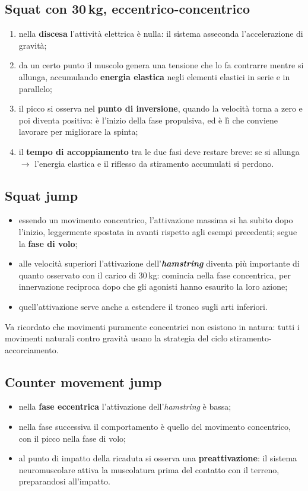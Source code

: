 \subsection{Squat con 30\,kg, eccentrico-concentrico}
\begin{enumerate}
  \item nella \textbf{discesa} l'attività elettrica è nulla: il sistema asseconda l'accelerazione di
    gravità;
  \item da un certo punto il muscolo genera una tensione che lo fa contrarre mentre si allunga,
    accumulando \textbf{energia elastica} negli elementi elastici in serie e in parallelo;
  \item il picco si osserva nel \textbf{punto di inversione}, quando la velocità torna a zero e poi
    diventa positiva: è l'inizio della fase propulsiva, ed è lì che conviene lavorare per migliorare
    la spinta;
  \item il \textbf{tempo di accoppiamento} tra le due fasi deve restare breve: se si allunga
    $\rightarrow$ l'energia elastica e il riflesso da stiramento accumulati si perdono.
\end{enumerate}

\subsection{Squat jump}
\begin{itemize}
  \item essendo un movimento concentrico, l'attivazione massima si ha subito dopo l'inizio,
    leggermente spostata in avanti rispetto agli esempi precedenti; segue la \textbf{fase di volo};
  \item alle velocità superiori l'attivazione dell'\textbf{\textit{hamstring}} diventa più
    importante di quanto osservato con il carico di 30\,kg: comincia nella fase concentrica, per
    innervazione reciproca dopo che gli agonisti hanno esaurito la loro azione;
  \item quell'attivazione serve anche a estendere il tronco sugli arti inferiori.
\end{itemize}
Va ricordato che movimenti puramente concentrici non esistono in natura: tutti i movimenti naturali
contro gravità usano la strategia del ciclo stiramento-accorciamento.

\subsection{Counter movement jump}
\begin{itemize}
  \item nella \textbf{fase eccentrica} l'attivazione dell'\textit{hamstring} è bassa;
  \item nella fase successiva il comportamento è quello del movimento concentrico, con il picco
    nella fase di volo;
  \item al punto di impatto della ricaduta si osserva una \textbf{preattivazione}: il sistema
    neuromuscolare attiva la muscolatura prima del contatto con il terreno, preparandosi
    all'impatto.
\end{itemize}

